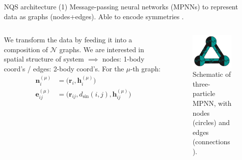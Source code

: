 \documentclass{beamer}
\begin{document}
\begin{frame}{NQS architecture (1)}
Message-passing neural networks (MPNNs) to represent data as graphs (nodes+edges). Able to encode 
symmetries \cite{gilmer2017neural}. 
\begin{columns}
\begin{column}{0.46\textwidth}
We transform the data by feeding it into a composition of $\mathcal{N}$ graphs. 
We are interested in spatial structure of system $\implies$ nodes: 1-body coord's / edges: 2-body coord's.
For the $\mu$-th graph:
{\small
\begin{equation*}
  \begin{split}
  \bm{n}_i^{(\mu)} &= \biggr(\bm{r}_i, \bm{h}_i^{(\mu)}\biggr) \\
  \bm{e}_{ij}^{(\mu)} &= \biggr(\bm{r}_{ij},d_{\sin}(i,j), \bm{h}_{ij}^{(\mu)}\biggr)
  \end{split}
\end{equation*}
}
\end{column}

\begin{column}{0.5\textwidth}
\begin{figure}
  \centering
  \includegraphics[scale=0.3]{figures/GNN_diagram.png}
  \caption{Schematic of three-particle MPNN, with nodes (circles) and edges (connections).}
  \label{fig:gnn_diagram}
\end{figure}
\end{column}

\end{columns}
\end{frame}
\end{document}

